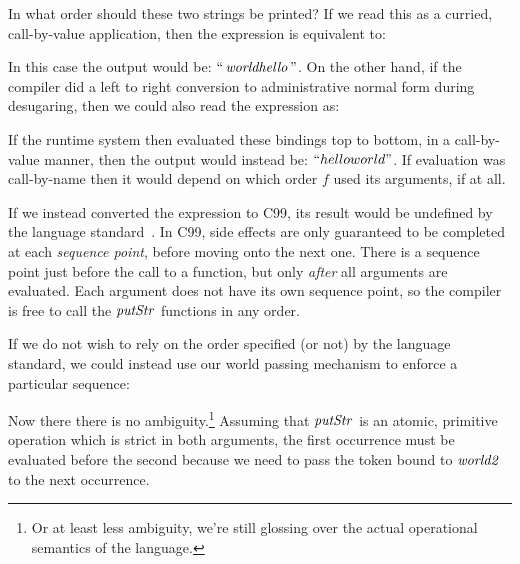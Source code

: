 
In what order should these two strings be printed? If we read this as a curried, call-by-value application, then the expression is equivalent to:


In this case the output would be: $``\operatorname{\mathit{worldhello}}"$. On the other hand, if the compiler did a left to right conversion to administrative normal form during desugaring, then we could also read the expression as:


If the runtime system then evaluated these bindings top to bottom, in a call-by-value manner, then the output would instead be: $``helloworld"$. If evaluation was call-by-name then it would depend on which order $f$ used its arguments, if at all. 

If we instead converted the expression to C99, its result would be undefined by the language standard~\cite{c99-standard}. In C99, side effects are only guaranteed to be completed at each \emph{sequence point}, before moving onto the next one. There is a sequence point just before the call to a function, but only \emph{after} all arguments are evaluated. Each argument does not have its own sequence point, so the compiler is free to call the $\operatorname{\mathit{putStr}}$ functions in any order.

If we do not wish to rely on the order specified (or not) by the language standard, we could instead use our world passing mechanism to enforce a particular sequence:


Now there there is no ambiguity.\footnote{Or at least less ambiguity, we're still glossing over the actual operational semantics of the language.} Assuming that $\operatorname{\mathit{putStr}}$ is an atomic, primitive operation which is strict in both arguments, the first occurrence must be evaluated before the second because we need to pass the token bound to $\operatorname{\mathit{world2}}$ to the next occurrence.

